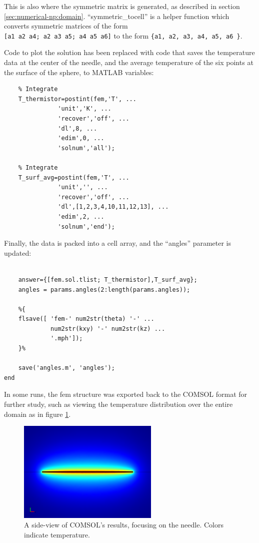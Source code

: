 This is also where the symmetric matrix is generated, as described in section
\ref{sec:numerical-np:domain}. ``symmetric\_tocell'' is a helper function which
converts symmetric matrices of the form \\
\texttt{[a1 a2 a4; a2 a3 a5; a4 a5 a6]} to the form \texttt{\{a1, a2, a3, a4, a5, a6 \}}.

Code to plot the solution has been replaced with code that saves the
temperature data at the center of the needle, and the average temperature of the
six points at the surface of the sphere, to MATLAB variables:

\small
\begin{verbatim}
    % Integrate
    T_thermistor=postint(fem,'T', ...
               'unit','K', ...
               'recover','off', ...
               'dl',8, ...
               'edim',0, ...
               'solnum','all');

    % Integrate
    T_surf_avg=postint(fem,'T', ...
               'unit','', ...
               'recover','off', ...
               'dl',[1,2,3,4,10,11,12,13], ...
               'edim',2, ...
               'solnum','end');
\end{verbatim}
\normalsize

Finally, the data is packed into a cell array, and the ``angles'' parameter
is updated:

\small
\begin{verbatim}

    answer={[fem.sol.tlist; T_thermistor],T_surf_avg};
    angles = params.angles(2:length(params.angles));

    %{
    flsave([ 'fem-' num2str(theta) '-' ...
             num2str(kxy) '-' num2str(kz) ...
             '.mph']);
    }%

    save('angles.m', 'angles');
end
\end{verbatim}
\normalsize

In some runs, the fem structure was exported back to the COMSOL format for
further study, such as viewing the temperature distribution over the entire
domain as in figure \ref{fig:comsol}.

\begin{figure}[h]
\centering
\includegraphics[width=0.6\textwidth]{fig/35892_elem_1097s.png}
\caption{A side-view of COMSOL's results, focusing on the needle. Colors indicate temperature.}
\label{fig:comsol}
\end{figure}

